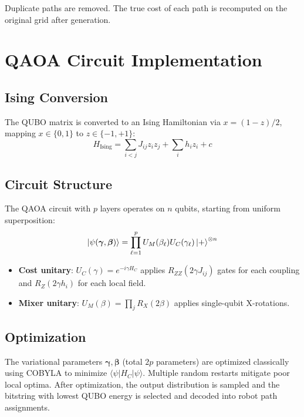 \documentclass[conference]{IEEEtran}
\begin{document}
Duplicate paths are removed. The true cost of each path is recomputed on the original grid after generation.

\section{QAOA Circuit Implementation}
\label{sec:qaoa}

\subsection{Ising Conversion}

The QUBO matrix is converted to an Ising Hamiltonian via $x = (1-z)/2$, mapping $x \in \{0,1\}$ to $z \in \{-1,+1\}$:
\begin{equation}
    H_{\text{Ising}} = \sum_{i<j} J_{ij} z_i z_j + \sum_i h_i z_i + c
\end{equation}

\subsection{Circuit Structure}

The QAOA circuit with $p$ layers operates on $n$ qubits, starting from uniform superposition:
\begin{equation}
    \ket{\psi(\boldsymbol{\gamma}, \boldsymbol{\beta})} = \prod_{\ell=1}^{p} U_M(\beta_\ell) U_C(\gamma_\ell) \ket{+}^{\otimes n}
\end{equation}

\begin{itemize}
    \item \textbf{Cost unitary}: $U_C(\gamma) = e^{-i\gamma H_C}$ applies $R_{ZZ}(2\gamma J_{ij})$ gates for each coupling and $R_Z(2\gamma h_i)$ for each local field.
    \item \textbf{Mixer unitary}: $U_M(\beta) = \prod_j R_X(2\beta)$ applies single-qubit X-rotations.
\end{itemize}

\subsection{Optimization}

The variational parameters $\boldsymbol{\gamma}, \boldsymbol{\beta}$ (total $2p$ parameters) are optimized classically using COBYLA to minimize $\langle\psi|H_C|\psi\rangle$. Multiple random restarts mitigate poor local optima. After optimization, the output distribution is sampled and the bitstring with lowest QUBO energy is selected and decoded into robot path assignments.
\end{document}

